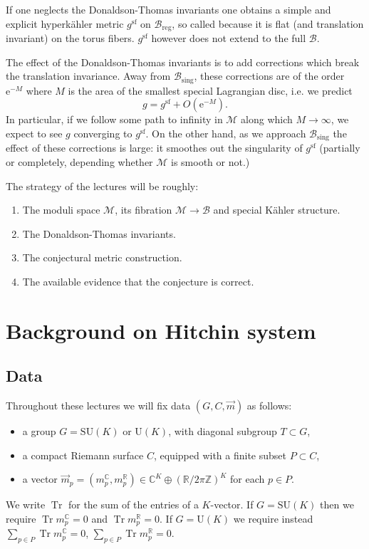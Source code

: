 \documentclass[12pt,letterpaper,reqno]{article}
\numberwithin{equation}{section}
\newcommand{\cB}{\ensuremath{\mathcal B}}
\newcommand{\cM}{\ensuremath{\mathcal M}}
\newcommand{\R}{\ensuremath{\mathbb R}}
\newcommand{\C}{\ensuremath{\mathbb C}}
\newcommand{\Z}{\ensuremath{\mathbb Z}}
\newcommand{\kahler}{K\"ahler\xspace}
\newcommand{\hk}{hyperk\"ahler\xspace}
\newcommand{\e}{{\mathrm e}}
\newcommand{\sing}{\mathrm{sing}}
\newcommand{\reg}{\mathrm{reg}}
\renewcommand{\sf}{\mathrm{sf}}
\DeclareMathOperator{\Tr}{Tr}
\newcommand{\SU}{\mathrm{SU}}
\newcommand{\U}{\mathrm{U}}
\begin{document}
If one neglects the Donaldson-Thomas invariants one obtains
a simple and explicit \hk metric $g^\sf$ on $\cB_\reg$, so called
because it is flat (and translation invariant) on the torus
fibers. $g^\sf$ however does not extend to the full $\cB$.

The effect of the Donaldson-Thomas invariants
is to add corrections which break the translation invariance.
Away from $\cB_\sing$, these corrections are of the order 
$\e^{-M}$ where $M$ is the area of the smallest 
special Lagrangian disc, i.e. we predict
\begin{equation}
  g = g^\sf + O(\e^{-M}).
\end{equation}
In particular, if we follow some path to infinity in $\cM$
along which $M \to \infty$, we expect to see $g$
converging to $g^\sf$.
On the other hand, as we approach $\cB_\sing$ the effect
of these corrections is large: it smoothes out the singularity
of $g^\sf$ (partially or completely, depending whether
$\cM$ is smooth or not.)

The strategy of the lectures will be roughly:
\begin{enumerate}
  \item The moduli space $\cM$, its fibration $\cM \to \cB$ and special \kahler structure.
  \item The Donaldson-Thomas invariants.
  \item The conjectural metric construction.
  \item The available evidence that the conjecture is correct.
\end{enumerate}


\section{Background on Hitchin system}

\subsection{Data}

Throughout these lectures we will fix data $(G,C,\vec m)$ as follows:
\begin{itemize}
  \item a group $G = \SU(K)$ or $\U(K)$, with diagonal subgroup $T \subset G$,
  \item a compact Riemann surface $C$, equipped with a finite subset $P \subset C$,
  \item a vector $\vec{m}_p = (m^\C_p, m^\R_p) \in \C^K \oplus (\R / 2 \pi \Z)^K$ for each $p \in P$.
\end{itemize}
We write $\Tr$ for the sum of the entries of a $K$-vector.
If $G = \SU(K)$ then we require
$\Tr m_p^\C = 0$ and $\Tr m_p^\R = 0$.
If $G = \U(K)$ we require instead 
$\sum_{p \in P} \Tr m_p^\C = 0$,
$\sum_{p \in P} \Tr m_p^\R = 0$.
\end{document}
